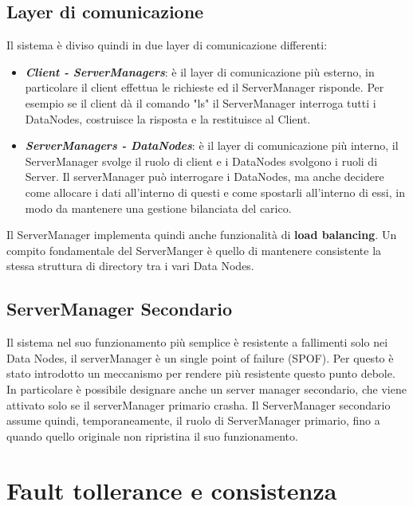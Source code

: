 \documentclass[]{article}
\begin{document}
\subsection{Layer di comunicazione}

Il sistema è diviso quindi in due layer di comunicazione differenti:

\begin{itemize}
	\item \textit{\textbf{Client - ServerManagers}}: è il layer di comunicazione più esterno, in particolare il client effettua le richieste ed il ServerManager risponde. Per esempio se il client dà il comando "ls" il ServerManager interroga tutti i DataNodes, costruisce la risposta e la restituisce al Client.
		
	\item \textit{\textbf{ServerManagers - DataNodes}}: è il layer di comunicazione più interno, il ServerManager svolge il ruolo di client e i DataNodes svolgono i ruoli di Server. Il serverManager può interrogare i DataNodes, ma anche decidere come allocare i dati all'interno di questi e come spostarli all'interno di essi, in modo da mantenere una gestione bilanciata del carico.
	
\end{itemize}

\vspace{0.5cm}
Il ServerManager implementa quindi anche funzionalità di \textbf{load balancing}.
Un compito fondamentale del ServerManger è quello di mantenere consistente la stessa struttura di directory tra i vari Data Nodes.

\subsection{ServerManager Secondario}

Il sistema nel suo funzionamento più semplice è resistente a fallimenti solo nei Data Nodes, il serverManager è un single point of failure (SPOF). Per questo è stato introdotto un meccanismo per rendere più resistente questo punto debole. In particolare è possibile designare anche un server manager secondario, che viene attivato solo se il serverManager primario crasha. Il ServerManager secondario assume quindi, temporaneamente, il ruolo di ServerManager primario, fino a quando quello originale non ripristina il suo funzionamento.

\newpage
\section{Fault tollerance e consistenza}
\end{document}
